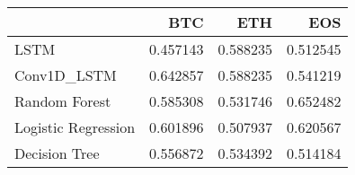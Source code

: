 \begin{tabular}{lrrr}
\toprule
{} &       BTC &       ETH &       EOS \\
\midrule
LSTM                &  0.457143 &  0.588235 &  0.512545 \\
Conv1D\_LSTM         &  0.642857 &  0.588235 &  0.541219 \\
Random Forest       &  0.585308 &  0.531746 &  0.652482 \\
Logistic Regression &  0.601896 &  0.507937 &  0.620567 \\
Decision Tree       &  0.556872 &  0.534392 &  0.514184 \\
\bottomrule
\end{tabular}
